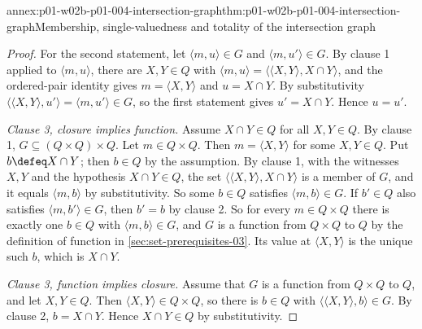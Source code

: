 \begin{annexitem}{annex:p01-w02b-p01-004-intersection-graph}{thm:p01-w02b-p01-004-intersection-graph}{Membership, single-valuedness and totality of the intersection graph}
\begin{proof}
For the second statement, let \(\langle m,u\rangle\in G\) and
\(\langle m,u'\rangle\in G\). By clause 1 applied to \(\langle m,u\rangle\),
there are \(X,Y\in Q\) with
\(\langle m,u\rangle=\langle\langle X,Y\rangle,X\cap Y\rangle\), and the
ordered-pair identity gives \(m=\langle X,Y\rangle\) and \(u=X\cap Y\). By
substitutivity \(\langle\langle X,Y\rangle,u'\rangle=\langle m,u'\rangle\in G\),
so the first statement gives \(u'=X\cap Y\). Hence \(u=u'\).

\emph{Clause 3, closure implies function.} Assume \(X\cap Y\in Q\) for all
\(X,Y\in Q\). By clause 1, \(G\subseteq(Q\times Q)\times Q\). Let
\(m\in Q\times Q\). Then \(m=\langle X,Y\rangle\) for some \(X,Y\in Q\). Put
\(b\defeq X\cap Y\); then \(b\in Q\) by the assumption. By clause 1, with the
witnesses \(X,Y\) and the hypothesis \(X\cap Y\in Q\), the set
\(\langle\langle X,Y\rangle,X\cap Y\rangle\) is a member of \(G\), and it equals
\(\langle m,b\rangle\) by substitutivity. So some \(b\in Q\) satisfies
\(\langle m,b\rangle\in G\). If \(b'\in Q\) also satisfies
\(\langle m,b'\rangle\in G\), then \(b'=b\) by clause 2. So for every
\(m\in Q\times Q\) there is exactly one \(b\in Q\) with
\(\langle m,b\rangle\in G\), and \(G\) is a function from \(Q\times Q\) to \(Q\)
by the definition of function in \cref{sec:set-prerequisites-03}. Its value at
\(\langle X,Y\rangle\) is the unique such \(b\), which is \(X\cap Y\).

\emph{Clause 3, function implies closure.} Assume that \(G\) is a function from
\(Q\times Q\) to \(Q\), and let \(X,Y\in Q\). Then
\(\langle X,Y\rangle\in Q\times Q\), so there is \(b\in Q\) with
\(\langle\langle X,Y\rangle,b\rangle\in G\). By clause 2, \(b=X\cap Y\). Hence
\(X\cap Y\in Q\) by substitutivity.
\end{proof}
\end{annexitem}

